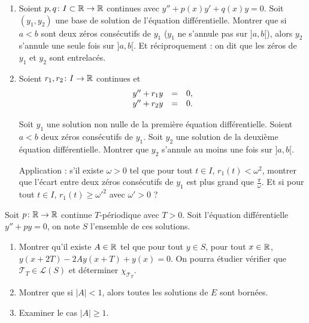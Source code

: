 \documentclass[12pt]{article}
\begin{document}
\begin{exercise}
	\phantom{}
	\begin{enumerate}
		\item Soient $p,q\colon I\subset\mathbb{R}\to\mathbb{R}$ continues avec $y''+p(x)y'+q(x)y=0$. Soit $(y_1,y_2)$ une base de solution de l'équation différentielle. Montrer que si $a<b$ sont deux zéros consécutifs de $y_1$ ($y_1$ ne s'annule pas sur $]a,b[$), alors $y_2$ s'annule une seule fois sur $]a,b[$. Et réciproquement : on dit que les zéros de $y_1$ et $y_2$ sont entrelacés.
		
		\item Soient $r_1,r_2\colon I\to\mathbb{R}$ continues et 
		\begin{equation*}
			\begin{array}[]{rcl}
				y''+r_1 y&=&0,\\
				y''+r_2 y&=&0.
			\end{array}
		\end{equation*}

		Soit $y_1$ une solution non nulle de la première équation différentielle. Soient $a<b$ deux zéros consécutifs de $y_1$. Soit $y_2$ une solution de la deuxième équation différentielle. Montrer que $y_2$ s'annule au moins une fois sur $]a,b[$.

		Application : s'il existe $\omega>0$ tel que pour tout $t\in I$, $r_1(t)<\omega^{2}$, montrer que l'écart entre deux zéros consécutifs de $y_1$ est plus grand que $\frac{\pi}{\omega}$. Et si pour tout $t\in I$, $r_1(t)\geqslant\omega'^{2}$ avec $\omega'>0$ ?
	\end{enumerate}
\end{exercise}

\begin{exercise}
	Soit $p\colon\mathbb{R}\to\mathbb{R}$ continue $T$-périodique avec $T>0$. Soit l'équation différentielle $y''+py=0$, on note $S$ l'ensemble de ces solutions.
	\begin{enumerate}
		\item Montrer qu'il existe $A\in\mathbb{R}$ tel que pour tout $y\in S$, pour tout $x\in\mathbb{R}$, $y(x+2T)-2Ay(x+T)+y(x)=0$. On pourra étudier 
		vérifier que $\mathcal{T}_T\in\mathcal{L}(S)$ et déterminer $\chi_{\mathcal{T}_T}$.

		\item Montrer que si $\left\lvert A\right\rvert<1$, alors toutes les solutions de $E$ sont bornées.
		\item Examiner le cas $\left\lvert A\right\rvert\geqslant1$.
	\end{enumerate}
\end{exercise}
\end{document}
